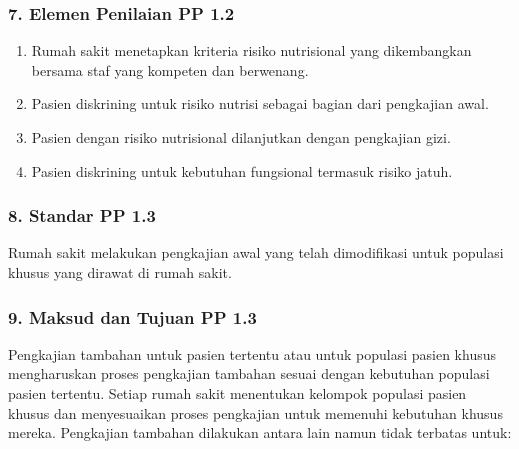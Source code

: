 \documentclass[
]{book}
\providecommand{\tightlist}{%
  \setlength{\itemsep}{0pt}\setlength{\parskip}{0pt}}
\begin{document}
\hypertarget{elemen-penilaian-pp-1.2}{%
\subsubsection*{7. Elemen Penilaian PP 1.2}\label{elemen-penilaian-pp-1.2}}

\begin{enumerate}
\def\labelenumi{\alph{enumi}.}
\tightlist
\item
  Rumah sakit menetapkan kriteria risiko nutrisional yang dikembangkan bersama staf yang kompeten dan berwenang.
\item
  Pasien diskrining untuk risiko nutrisi sebagai bagian dari pengkajian awal.
\item
  Pasien dengan risiko nutrisional dilanjutkan dengan pengkajian gizi.
\item
  Pasien diskrining untuk kebutuhan fungsional termasuk risiko jatuh.
\end{enumerate}

\hypertarget{standar-pp-1.3}{%
\subsubsection*{8. Standar PP 1.3}\label{standar-pp-1.3}}

Rumah sakit melakukan pengkajian awal yang telah dimodifikasi untuk populasi khusus yang dirawat di rumah sakit.

\hypertarget{maksud-dan-tujuan-pp-1.3}{%
\subsubsection*{9. Maksud dan Tujuan PP 1.3}\label{maksud-dan-tujuan-pp-1.3}}

Pengkajian tambahan untuk pasien tertentu atau untuk populasi pasien khusus mengharuskan proses pengkajian tambahan sesuai dengan kebutuhan populasi pasien tertentu. Setiap rumah sakit menentukan kelompok populasi pasien khusus dan menyesuaikan proses pengkajian untuk memenuhi kebutuhan khusus mereka.
Pengkajian tambahan dilakukan antara lain namun tidak terbatas untuk:
\end{document}
